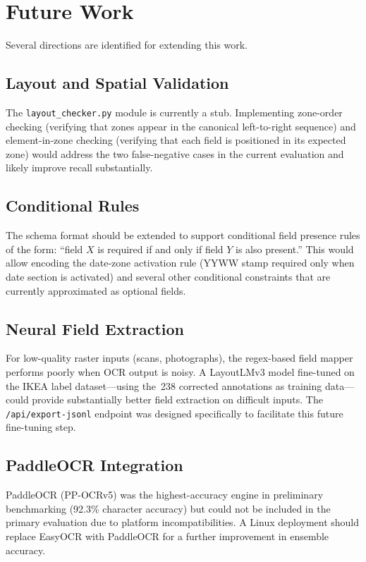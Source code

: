\section{Future Work}

Several directions are identified for extending this work.

\subsection{Layout and Spatial Validation}

The \texttt{layout\_checker.py} module is currently a stub. Implementing zone-order
checking (verifying that zones appear in the canonical left-to-right sequence) and
element-in-zone checking (verifying that each field is positioned in its expected zone)
would address the two false-negative cases in the current evaluation and likely improve
recall substantially.

\subsection{Conditional Rules}

The schema format should be extended to support conditional field presence rules of the
form: ``field $X$ is required if and only if field $Y$ is also present.'' This would allow
encoding the date-zone activation rule (YYWW stamp required only when date section is
activated) and several other conditional constraints that are currently approximated as
optional fields.

\subsection{Neural Field Extraction}

For low-quality raster inputs (scans, photographs), the regex-based field mapper performs
poorly when OCR output is noisy. A LayoutLMv3 model fine-tuned on the IKEA label
dataset—using the~238 corrected annotations as training data—could provide substantially
better field extraction on difficult inputs. The \texttt{/api/export-jsonl} endpoint was
designed specifically to facilitate this future fine-tuning step.

\subsection{PaddleOCR Integration}

PaddleOCR (PP-OCRv5) was the highest-accuracy engine in preliminary benchmarking
(92.3\% character accuracy) but could not be included in the primary evaluation due to
platform incompatibilities. A Linux deployment should replace EasyOCR with PaddleOCR
for a further improvement in ensemble accuracy.

